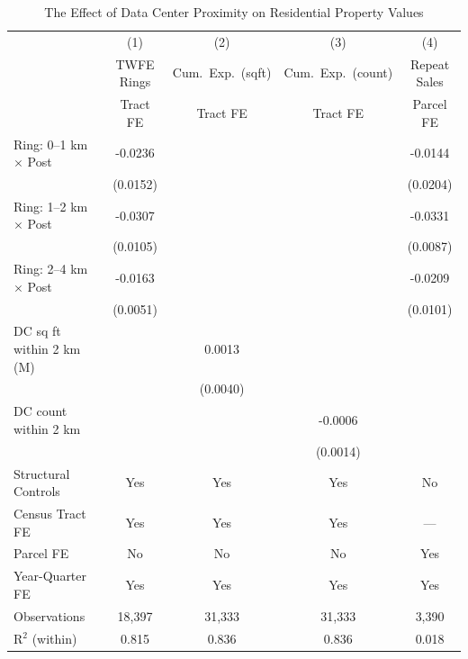 \begin{table}[!t]
\centering
\caption{The Effect of Data Center Proximity on Residential Property Values}
\label{tab:main}
\small
\begin{tabular}{lcccc}
\toprule
 & (1) & (2) & (3) & (4) \\
 & TWFE Rings & Cum.\ Exp.\ (sqft) & Cum.\ Exp.\ (count) & Repeat Sales \\
 & Tract FE & Tract FE & Tract FE & Parcel FE \\
\midrule
Ring: 0--1 km $\times$ Post & -0.0236 & & & -0.0144 \\
 & (0.0152) & & & (0.0204) \\
[2pt]
Ring: 1--2 km $\times$ Post & -0.0307 & & & -0.0331 \\
 & (0.0105) & & & (0.0087) \\
[2pt]
Ring: 2--4 km $\times$ Post & -0.0163 & & & -0.0209 \\
 & (0.0051) & & & (0.0101) \\
[2pt]
DC sq ft within 2 km (M) & & 0.0013 & & \\
 & & (0.0040) & & \\
[2pt]
DC count within 2 km & & & -0.0006 & \\
 & & & (0.0014) & \\
\midrule
Structural Controls & Yes & Yes & Yes & No \\
Census Tract FE & Yes & Yes & Yes & --- \\
Parcel FE & No & No & No & Yes \\
Year-Quarter FE & Yes & Yes & Yes & Yes \\
\midrule
Observations & 18,397 & 31,333 & 31,333 & 3,390 \\
R$^2$ (within) & 0.815 & 0.836 & 0.836 & 0.018 \\
\bottomrule
\end{tabular}
\end{table}
